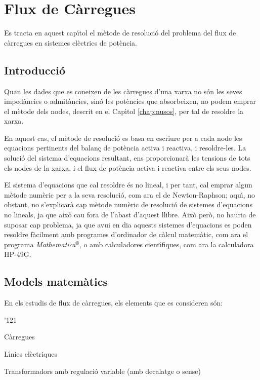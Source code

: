 \chapter{Flux de C\`{a}rregues}

Es tracta en aquest cap\'{\i}tol el m\`{e}tode de resoluci\'{o} del problema del flux de c\`{a}rregues en
sistemes el\`{e}ctrics de pot\`{e}ncia.

\section{Introducci\'{o}}

Quan les dades que es coneixen de les c\`{a}rregues d'una xarxa no s\'{o}n
les seves imped\`{a}ncies o admit\`{a}ncies, sin\'{o} les pot\`{e}ncies que
absorbeixen, no podem emprar el m\`{e}tode dels nodes, descrit en el
Cap\'{\i}tol \ref{chap:nusos}, per tal de resoldre la xarxa.

En aquest cas, el m\`{e}tode de resoluci\'{o} es basa en escriure per a cada
node les equacions pertinents del balan\c{c} de pot\`{e}ncia activa i
reactiva, i resoldre-les. La soluci\'{o} del sistema d'equacions
resultant, ens proporcionar\`{a} les tensions de tots els nodes de la
xarxa, i el flux de pot\`{e}ncia activa i reactiva entre els seus nodes.

El sistema d'equacions que cal resoldre \'{e}s no lineal, i per tant,
cal emprar algun m\`{e}tode num\`{e}ric per a la seva resoluci\'{o}, com ara el
de Newton-Raphson; aqu\'{\i}, no obstant, no
s'explicar\`{a} cap m\`{e}tode num\`{e}ric de resoluci\'{o} de sistemes d'equacions
no lineals, ja que aix\`{o} cau fora de l'abast d'aquest llibre. Aix\`{o}
per\`{o}, no hauria de suposar cap problema, ja que avui en dia aquests
sistemes d'equacions es poden resoldre f\`{a}cilment amb programes
d'ordinador de c\`{a}lcul matem\`{a}tic, com ara el programa
\textit{Mathematica}${}^\circledR$,
 o amb
calculadores cient\'{\i}fiques, com ara la calculadora \textsf{HP-49G}.

\section{Models matem\`{a}tics} 

En els estudis de flux de c\`{a}rregues, els elements que es consideren s\'{o}n:
\begin{dinglist}{'121}
   \item C\`{a}rregues
   \item L\'{\i}nies el\`{e}ctriques
   \item Transformadors amb regulaci\'{o} variable (amb decalatge o sense)
\end{dinglist}


